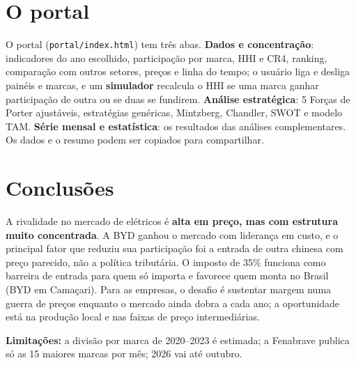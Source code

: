 \documentclass[10pt,a4paper]{article}
\begin{document}
\section{O portal}
O portal (\texttt{portal/index.html}) tem três abas. \textbf{Dados e concentração}: indicadores do ano escolhido, participação por marca, HHI e CR4, ranking, comparação com outros setores, preços e linha do tempo; o usuário liga e desliga painéis e marcas, e um \textbf{simulador} recalcula o HHI se uma marca ganhar participação de outra ou se duas se fundirem. \textbf{Análise estratégica}: 5 Forças de Porter ajustáveis, estratégias genéricas, Mintzberg, Chandler, SWOT e modelo TAM. \textbf{Série mensal e estatística}: os resultados das análises complementares. Os dados e o resumo podem ser copiados para compartilhar.

\section{Conclusões}
A rivalidade no mercado de elétricos é \textbf{alta em preço, mas com estrutura muito concentrada}. A BYD ganhou o mercado com liderança em custo, e o principal fator que reduziu sua participação foi a entrada de outra chinesa com preço parecido, não a política tributária. O imposto de 35\% funciona como barreira de entrada para quem só importa e favorece quem monta no Brasil (BYD em Camaçari). Para as empresas, o desafio é sustentar margem numa guerra de preços enquanto o mercado ainda dobra a cada ano; a oportunidade está na produção local e nas faixas de preço intermediárias.

\textbf{Limitações:} a divisão por marca de 2020--2023 é estimada; a Fenabrave publica só as 15 maiores marcas por mês; 2026 vai até outubro.
\end{document}
